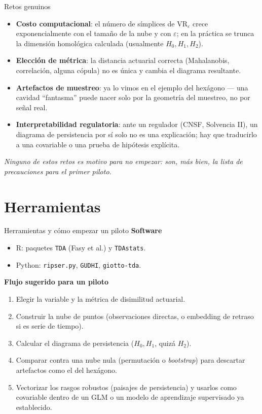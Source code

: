 \documentclass[aspectratio=169,11pt]{beamer}
\begin{document}
\begin{frame}{Retos genuinos}
  \begin{itemize}
    \item \textbf{Costo computacional}: el número de símplices de
      $\mathrm{VR}_\varepsilon$ crece exponencialmente con el tamaño de la
      nube y con $\varepsilon$; en la práctica se trunca la dimensión
      homológica calculada (usualmente $H_0,H_1,H_2$).
    \item \textbf{Elección de métrica}: la distancia actuarial correcta
      (Mahalanobis, correlación, alguna cópula) no es única y cambia el
      diagrama resultante.
    \item \textbf{Artefactos de muestreo}: ya lo vimos en el ejemplo del
      hexágono --- una cavidad ``fantasma'' puede nacer solo por la
      geometría del muestreo, no por señal real.
    \item \textbf{Interpretabilidad regulatoria}: ante un regulador (CNSF,
      Solvencia II), un diagrama de persistencia por sí solo no es una
      explicación; hay que traducirlo a una covariable o una prueba de
      hipótesis explícita.
  \end{itemize}
  \vspace{0.6em}
  {\small\itshape\color{muted}
  Ninguno de estos retos es motivo para no empezar: son, más bien, la
  lista de precauciones para el primer piloto.}
\end{frame}

\section{Herramientas}
\begin{frame}{Herramientas y cómo empezar un piloto}
  \textbf{Software}
  \begin{itemize}
    \item R: paquetes \texttt{TDA} (Fasy et al.) y \texttt{TDAstats}.
    \item Python: \texttt{ripser.py}, \texttt{GUDHI}, \texttt{giotto-tda}.
  \end{itemize}
  \vspace{0.4em}
  \textbf{Flujo sugerido para un piloto}
  \begin{enumerate}
    \setlength{\itemsep}{0.4em}
    \item Elegir la variable y la métrica de disimilitud actuarial.
    \item Construir la nube de puntos (observaciones directas, o
      embedding de retraso si es serie de tiempo).
    \item Calcular el diagrama de persistencia ($H_0,H_1$, quizá $H_2$).
    \item Comparar contra una nube nula (permutación o \textit{bootstrap})
      para descartar artefactos como el del hexágono.
    \item Vectorizar los rasgos robustos (paisajes de persistencia) y
      usarlos como covariable dentro de un GLM o un modelo de aprendizaje
      supervisado ya establecido.
  \end{enumerate}
\end{frame}
\end{document}
